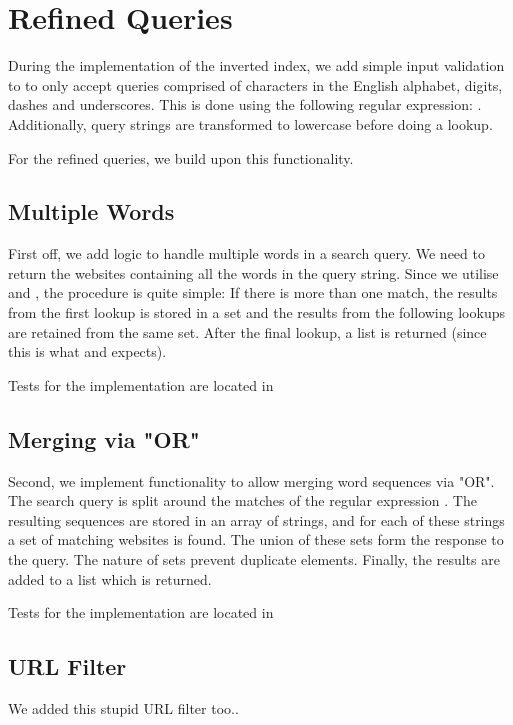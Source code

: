 \section{Refined Queries}

During the implementation of the inverted index, we add simple input validation to  to only accept queries comprised of characters in the English alphabet, digits, dashes and underscores. This is done using the following regular expression: \code{\\\\b([-\\\\w]+)\\\\b}. Additionally, query strings are transformed to lowercase before doing a lookup.

For the refined queries, we build upon this functionality.

\subsection{Multiple Words}
First off, we add logic to handle multiple words in a search query. We need to return the websites containing all the words in the query string. Since we utilise  and , the procedure is quite simple: If there is more than one match, the results from the first lookup is stored in a set and the results from the following lookups are retained from the same set. After the final lookup, a list is returned (since this is what  and  expects).

Tests for the implementation are located in 

\subsection{Merging via "OR"}
Second, we implement functionality to allow merging word sequences via "OR". The search query is split around the matches of the regular expression \code{\\\\bOR\\\\b}. The resulting sequences are stored in an array of strings, and for each of these strings a set of matching websites is found. The union of these sets form the response to the query. The nature of sets prevent duplicate elements. Finally, the results are added to a list which is returned.

Tests for the implementation are located in 

\subsection{URL Filter}
We added this stupid URL filter too..